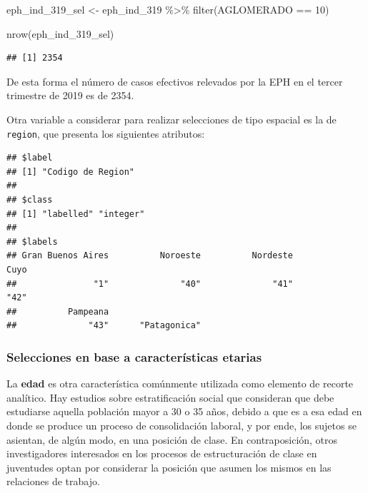 \documentclass[
]{book}
\newenvironment{Shaded}{\begin{snugshade}}{\end{snugshade}}
\newcommand{\DecValTok}[1]{\textcolor[rgb]{0.00,0.00,0.81}{#1}}
\newcommand{\FunctionTok}[1]{\textcolor[rgb]{0.00,0.00,0.00}{#1}}
\newcommand{\NormalTok}[1]{#1}
\newcommand{\OtherTok}[1]{\textcolor[rgb]{0.56,0.35,0.01}{#1}}
\newcommand{\SpecialCharTok}[1]{\textcolor[rgb]{0.00,0.00,0.00}{#1}}
\begin{document}
\begin{Shaded}
\begin{Highlighting}[]
\NormalTok{eph\_ind\_319\_sel }\OtherTok{\textless{}{-}}\NormalTok{ eph\_ind\_319 }\SpecialCharTok{\%\textgreater{}\%} 
    \FunctionTok{filter}\NormalTok{(AGLOMERADO }\SpecialCharTok{==} \DecValTok{10}\NormalTok{)}

\FunctionTok{nrow}\NormalTok{(eph\_ind\_319\_sel)}
\end{Highlighting}
\end{Shaded}

\begin{verbatim}
## [1] 2354
\end{verbatim}

De esta forma el número de casos efectivos relevados por la EPH en el tercer trimestre de 2019 es de 2354.

Otra variable a considerar para realizar selecciones de tipo espacial es la de \texttt{region}, que presenta los siguientes atributos:

\begin{Shaded}
\end{Shaded}

\begin{verbatim}
## $label
## [1] "Codigo de Region"
## 
## $class
## [1] "labelled" "integer" 
## 
## $labels
## Gran Buenos Aires          Noroeste          Nordeste              Cuyo 
##               "1"              "40"              "41"              "42" 
##          Pampeana                   
##              "43"      "Patagonica"
\end{verbatim}

\hypertarget{selecciones-en-base-a-caracteruxedsticas-etarias}{%
\subsubsection{Selecciones en base a características etarias}\label{selecciones-en-base-a-caracteruxedsticas-etarias}}

La \textbf{edad} es otra característica comúnmente utilizada como elemento de recorte analítico. Hay estudios sobre estratificación social \citep{Erikson1992} que consideran que debe estudiarse aquella población mayor a 30 o 35 años, debido a que es a esa edad en donde se produce un proceso de consolidación laboral, y por ende, los sujetos se asientan, de algún modo, en una posición de clase. En contraposición, otros investigadores interesados en los procesos de estructuración de clase en juventudes optan por considerar la posición que asumen los mismos en las relaciones de trabajo.
\end{document}
